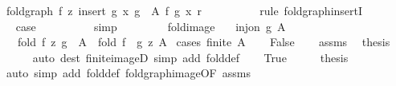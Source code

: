 \begin{isabellebody}
\ {\isachardoublequoteopen}fold{\isacharunderscore}{\kern0pt}graph\ f\ z\ {\isacharparenleft}{\kern0pt}insert\ {\isacharparenleft}{\kern0pt}g\ x{\isacharparenright}{\kern0pt}\ {\isacharparenleft}{\kern0pt}g\ {\isacharbackquote}{\kern0pt}\ A{\isacharparenright}{\kern0pt}{\isacharparenright}{\kern0pt}\ {\isacharparenleft}{\kern0pt}f\ {\isacharparenleft}{\kern0pt}g\ x{\isacharparenright}{\kern0pt}\ r{\isacharparenright}{\kern0pt}{\isachardoublequoteclose}\isanewline
\ \ \ \ \ \ \ \ \isamarkupfalse%
\ {\isacharparenleft}{\kern0pt}rule\ fold{\isacharunderscore}{\kern0pt}graph{\isachardot}{\kern0pt}insertI{\isacharparenright}{\kern0pt}\isanewline
\ \ \ \ \ \ \isamarkupfalse%
\ \isamarkupfalse%
\ {\isacharquery}{\kern0pt}case\isanewline
\ \ \ \ \ \ \ \ \isamarkupfalse%
\ simp\isanewline
\ \ \ \ \isamarkupfalse%
\isanewline
\ \ \isamarkupfalse%
\isanewline
{}\isamarkupfalse%
%
\endisatagproof
{\isafoldproof}%
%
\isadelimproof
\isanewline
%
\endisadelimproof
\isanewline
{}\isamarkupfalse%
\ fold{\isacharunderscore}{\kern0pt}image{\isacharcolon}{\kern0pt}\isanewline
\ \ \ {\isachardoublequoteopen}inj{\isacharunderscore}{\kern0pt}on\ g\ A{\isachardoublequoteclose}\isanewline
\ \ \ {\isachardoublequoteopen}fold\ f\ z\ {\isacharparenleft}{\kern0pt}g\ {\isacharbackquote}{\kern0pt}\ A{\isacharparenright}{\kern0pt}\ {\isacharequal}{\kern0pt}\ fold\ {\isacharparenleft}{\kern0pt}f\ {\isasymcirc}\ g{\isacharparenright}{\kern0pt}\ z\ A{\isachardoublequoteclose}\isanewline
%
\isadelimproof
%
\endisadelimproof
%
\isatagproof
{}\isamarkupfalse%
\ {\isacharparenleft}{\kern0pt}cases\ {\isachardoublequoteopen}finite\ A{\isachardoublequoteclose}{\isacharparenright}{\kern0pt}\isanewline
\ \ \isamarkupfalse%
\ False\isanewline
\ \ \isamarkupfalse%
\ assms\ \isamarkupfalse%
\ {\isacharquery}{\kern0pt}thesis\isanewline
\ \ \ \ \isamarkupfalse%
\ {\isacharparenleft}{\kern0pt}auto\ dest{\isacharcolon}{\kern0pt}\ finite{\isacharunderscore}{\kern0pt}imageD\ simp\ add{\isacharcolon}{\kern0pt}\ fold{\isacharunderscore}{\kern0pt}def{\isacharparenright}{\kern0pt}\isanewline
{}\isamarkupfalse%
\isanewline
\ \ \isamarkupfalse%
\ True\isanewline
\ \ \isamarkupfalse%
\ \isamarkupfalse%
\ {\isacharquery}{\kern0pt}thesis\isanewline
\ \ \ \ \isamarkupfalse%
\ {\isacharparenleft}{\kern0pt}auto\ simp\ add{\isacharcolon}{\kern0pt}\ fold{\isacharunderscore}{\kern0pt}def\ fold{\isacharunderscore}{\kern0pt}graph{\isacharunderscore}{\kern0pt}image{\isacharbrackleft}{\kern0pt}OF\ assms{\isacharbrackright}{\kern0pt}{\isacharparenright}{\kern0pt}\isanewline

\end{isabellebody}
